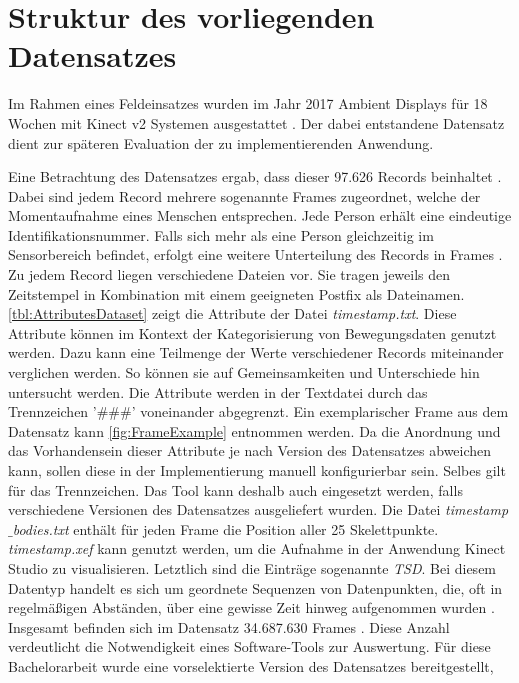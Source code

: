 \section{Struktur des vorliegenden Datensatzes}
\label{2-StrukturDatensatz}
Im Rahmen eines Feldeinsatzes wurden im Jahr 2017 Ambient Displays für 18 Wochen mit Kinect v2 Systemen ausgestattet \citep{schwarzer_spontaneous_2021}.
Der dabei entstandene Datensatz dient zur späteren Evaluation der zu implementierenden Anwendung.

Eine Betrachtung des Datensatzes ergab, dass dieser 97.626 Records beinhaltet \citep{temiz_konzeption_2022}.
Dabei sind jedem Record mehrere sogenannte Frames zugeordnet,
welche der Momentaufnahme eines Menschen entsprechen.
Jede Person erhält eine eindeutige Identifikationsnummer.
Falls sich mehr als eine Person gleichzeitig im Sensorbereich befindet,
erfolgt eine weitere Unterteilung des Records in Frames \citep{temiz_konzeption_2022}.
Zu jedem Record liegen verschiedene Dateien vor.
Sie tragen jeweils den Zeitstempel in Kombination mit einem geeigneten Postfix als Dateinamen.
\autoref{tbl:AttributesDataset} zeigt die Attribute der Datei \emph{timestamp.txt}.
Diese Attribute können im Kontext der Kategorisierung von Bewegungsdaten genutzt werden.
Dazu kann eine Teilmenge der Werte verschiedener Records miteinander verglichen werden.
So können sie auf Gemeinsamkeiten und Unterschiede hin untersucht werden.
Die Attribute werden in der Textdatei durch das Trennzeichen '\#\#\#' voneinander abgegrenzt.
Ein exemplarischer Frame aus dem Datensatz kann \autoref{fig:FrameExample} entnommen werden.
Da die Anordnung und das Vorhandensein dieser Attribute je nach Version des Datensatzes abweichen kann,
sollen diese in der Implementierung manuell konfigurierbar sein.
Selbes gilt für das Trennzeichen.
Das Tool kann deshalb auch eingesetzt werden,
falls verschiedene Versionen des Datensatzes ausgeliefert wurden.
Die Datei \emph{timestamp$\_$bodies.txt} enthält für jeden Frame die Position aller 25 Skelettpunkte.
\emph{timestamp.xef} kann genutzt werden, um die Aufnahme in der Anwendung Kinect Studio zu visualisieren.
Letztlich sind die Einträge sogenannte \emph{\ac{TSD}}.
Bei diesem Datentyp handelt es sich um geordnete Sequenzen von Datenpunkten,
die, oft in regelmäßigen Abständen, über eine gewisse Zeit hinweg aufgenommen wurden \citep{ali_clustering_2019}.
Insgesamt befinden sich im Datensatz 34.687.630 Frames \citep{temiz_konzeption_2022}.
Diese Anzahl verdeutlicht die Notwendigkeit eines Software-Tools zur Auswertung.
Für diese Bachelorarbeit wurde eine vorselektierte Version des Datensatzes bereitgestellt,
